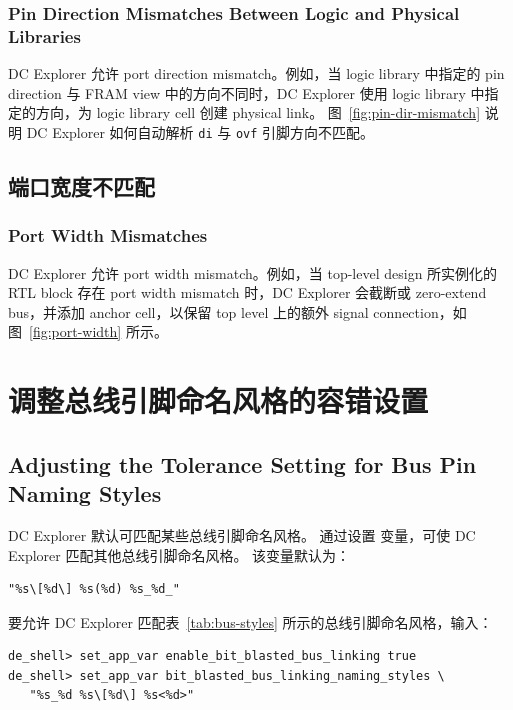 \subsubsection*{Pin Direction Mismatches Between Logic and Physical Libraries}

DC Explorer 允许 port direction mismatch。例如，当 logic library 中指定的 pin direction 与 FRAM view 中的方向不同时，DC Explorer 使用 logic library 中指定的方向，为 logic library cell 创建 physical link。
图~\ref{fig:pin-dir-mismatch} 说明 DC Explorer 如何自动解析 \texttt{di} 与 \texttt{ovf} 引脚方向不匹配。


\subsection{端口宽度不匹配}
\subsubsection*{Port Width Mismatches}

DC Explorer 允许 port width mismatch。例如，当 top-level design 所实例化的 RTL block 存在 port width mismatch 时，DC Explorer 会截断或 zero-extend bus，并添加 anchor cell，以保留 top level 上的额外 signal connection，如图~\ref{fig:port-width} 所示。


\section{调整总线引脚命名风格的容错设置}
\subsection*{Adjusting the Tolerance Setting for Bus Pin Naming Styles}

DC Explorer 默认可匹配某些总线引脚命名风格。
通过设置  变量，可使 DC Explorer 匹配其他总线引脚命名风格。
该变量默认为：
\begin{lstlisting}
"%s\[%d\] %s(%d) %s_%d_"
\end{lstlisting}
要允许 DC Explorer 匹配表~\ref{tab:bus-styles} 所示的总线引脚命名风格，输入：
\begin{lstlisting}
de_shell> set_app_var enable_bit_blasted_bus_linking true
de_shell> set_app_var bit_blasted_bus_linking_naming_styles \
   "%s_%d %s\[%d\] %s<%d>"
\end{lstlisting}

